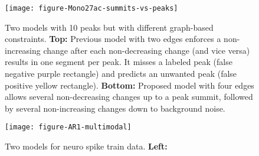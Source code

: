 \documentclass{article}
\begin{document}
\begin{figure}
  \centering
  \texttt{[image: figure-Mono27ac-summits-vs-peaks]}
  \caption{Two models with 10 peaks but with different graph-based
    constraints. \textbf{Top:} Previous model with two edges enforces
    a non-increasing change after each non-decreasing change (and vice
    versa) results in one segment per peak. It misses a labeled peak
    (false negative purple rectangle) and predicts an unwanted peak
    (false positive yellow rectangle). \textbf{Bottom:} Proposed model
    with four edges allows several non-decreasing changes up to a peak
    summit, followed by several non-increasing changes down to
    background noise.}
  \label{fig:summits-vs-peaks}
\end{figure}

\begin{figure}
  \centering
  \texttt{[image: figure-AR1-multimodal]}
  \caption{Two models for neuro spike train data. \textbf{Left:}}
  \label{fig:AR1-multimodal}
\end{figure}



\end{document}

